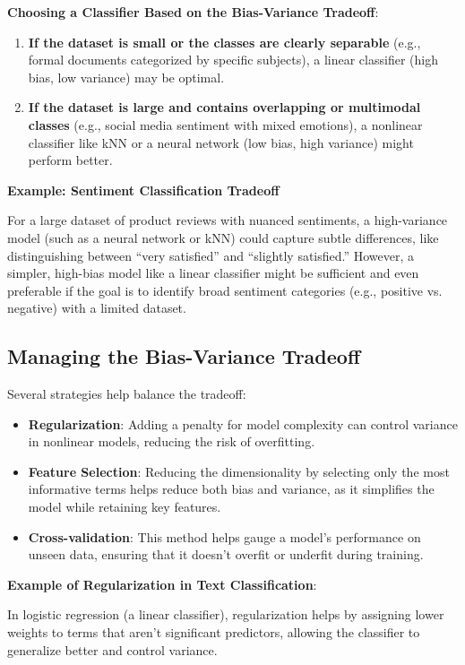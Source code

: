 \documentclass{article}
\begin{document}
\textbf{Choosing a Classifier Based on the Bias-Variance Tradeoff}:
\begin{enumerate}
    \item \textbf{If the dataset is small or the classes are clearly separable} (e.g., formal documents categorized by specific subjects), a linear classifier (high bias, low variance) may be optimal.
    \item \textbf{If the dataset is large and contains overlapping or multimodal classes} (e.g., social media sentiment with mixed emotions), a nonlinear classifier like kNN or a neural network (low bias, high variance) might perform better.
\end{enumerate}

\textbf{Example: Sentiment Classification Tradeoff}

For a large dataset of product reviews with nuanced sentiments, a high-variance model (such as a neural network or kNN) could capture subtle differences, like distinguishing between “very satisfied” and “slightly satisfied.” However, a simpler, high-bias model like a linear classifier might be sufficient and even preferable if the goal is to identify broad sentiment categories (e.g., positive vs. negative) with a limited dataset.

\subsection{Managing the Bias-Variance Tradeoff}

Several strategies help balance the tradeoff:
\begin{itemize}
    \item \textbf{Regularization}: Adding a penalty for model complexity can control variance in nonlinear models, reducing the risk of overfitting.
    \item \textbf{Feature Selection}: Reducing the dimensionality by selecting only the most informative terms helps reduce both bias and variance, as it simplifies the model while retaining key features.
    \item \textbf{Cross-validation}: This method helps gauge a model’s performance on unseen data, ensuring that it doesn’t overfit or underfit during training.
\end{itemize}

\textbf{Example of Regularization in Text Classification}:

In logistic regression (a linear classifier), regularization helps by assigning lower weights to terms that aren’t significant predictors, allowing the classifier to generalize better and control variance.
\end{document}
